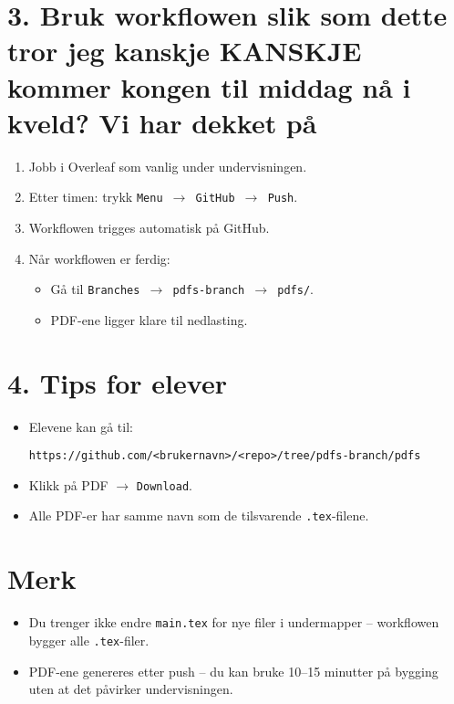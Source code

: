 \documentclass[a4paper,12pt]{article}
\begin{document}
\section*{3. Bruk workflowen slik som dette tror jeg kanskje KANSKJE kommer kongen til middag nå i kveld? Vi har dekket på}
\begin{enumerate}[label=\arabic*.]
    \item Jobb i Overleaf som vanlig under undervisningen.
    \item Etter timen: trykk \texttt{Menu $\to$ GitHub $\to$ Push}.
    \item Workflowen trigges automatisk på GitHub.
    \item Når workflowen er ferdig:
    \begin{itemize}
        \item Gå til \texttt{Branches $\to$ pdfs-branch $\to$ pdfs/}.
        \item PDF-ene ligger klare til nedlasting.
    \end{itemize}
\end{enumerate}

\section*{4. Tips for elever}
\begin{itemize}
    \item Elevene kan gå til:
    \begin{verbatim}
https://github.com/<brukernavn>/<repo>/tree/pdfs-branch/pdfs
    \end{verbatim}
    \item Klikk på PDF $\to$ \texttt{Download}.
    \item Alle PDF-er har samme navn som de tilsvarende \texttt{.tex}-filene.
\end{itemize}

\section*{Merk}
\begin{itemize}
    \item Du trenger ikke endre \texttt{main.tex} for nye filer i undermapper – workflowen bygger alle \texttt{.tex}-filer.
    \item PDF-ene genereres etter push – du kan bruke 10--15 minutter på bygging uten at det påvirker undervisningen.
\end{itemize}
\end{document}
